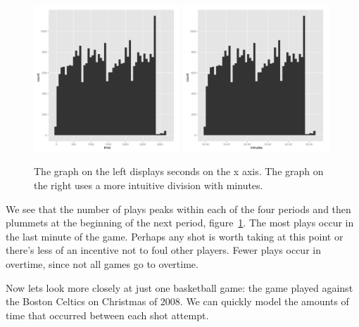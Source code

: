 \documentclass[article]{jss}
\begin{document}
\begin{figure}[htpb]
  \centering
  \includegraphics[width=0.49\textwidth]{play-time-histogram.png}        
  \includegraphics[width=0.49\textwidth]{play-time-histogram2.png} 
  \caption{The graph on the left displays seconds on the x axis. The graph on the right uses a more intuitive division with minutes.}
  \label{fig:plays}
\end{figure}

We see that the number of plays peaks within each of the four periods and then plummets at the beginning of the next period, figure~\ref{fig:plays}. The most plays occur in the last minute of the game. Perhaps any shot is worth taking at this point or there's less of an incentive not to foul other players. Fewer plays occur in overtime, since not all games go to overtime.

Now lets look more closely at just one basketball game: the game played against the Boston Celtics on Christmas of 2008. We can quickly model the amounts of time that occurred between each shot attempt.\\

\\
\\
\end{document}
